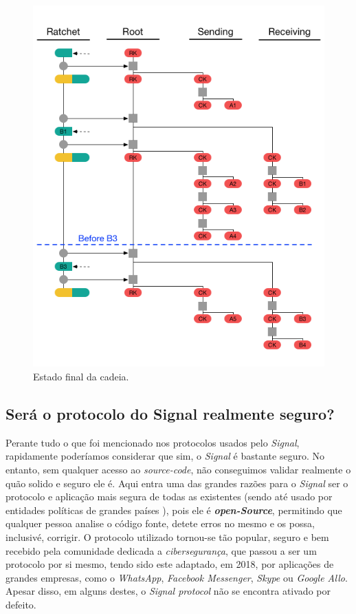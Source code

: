 \begin{figure}[H]
\begin{center}
\includegraphics[width=12cm]{img/DR5.png}
\caption{Estado final da cadeia.}
\label{diagram:DR5} 
\centering
\end{center}
\end{figure}


\subsection{Será o protocolo do Signal realmente seguro?}

Perante tudo o que foi mencionado nos protocolos usados pelo \textit{Signal}, rapidamente poderíamos considerar que sim, o \textit{Signal} é bastante seguro. No entanto, sem qualquer acesso ao \textit{source-code}, não conseguimos validar realmente o quão solido e seguro ele é. Aqui entra uma das grandes razões para o \textit{Signal} ser o protocolo e aplicação mais segura de todas as existentes (sendo até usado por entidades políticas de grandes países \cite{politicsSignal}), pois ele é \textbf{\textit{open-Source}}, permitindo que qualquer pessoa analise o código fonte, detete erros no mesmo e os possa, inclusivé, corrigir. O protocolo utilizado tornou-se tão popular, seguro e bem recebido pela comunidade dedicada a \textit{cibersegurança}, que passou a ser um protocolo por si mesmo, tendo sido este adaptado, em 2018, por aplicações de grandes empresas, como o \textit{WhatsApp}, \textit{Facebook Messenger}, \textit{Skype} ou \textit{Google Allo}. Apesar disso, em alguns destes, o \textit{Signal protocol} não se encontra ativado por defeito.

